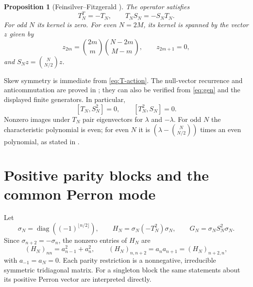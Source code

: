 \documentclass[11pt,reqno]{amsart}
\newtheorem{proposition}[theorem]{Proposition}
\theoremstyle{definition}\newtheorem{definition}[theorem]{Definition}
\theoremstyle{remark}\newtheorem{remark}[theorem]{Remark}
\DeclareMathOperator{\diag}{diag}
\begin{document}
\begin{proposition}[Feinsilver--Fitzgerald \cite{FF}]
\label{prop:T}
The operator satisfies
\begin{equation}\label{eq:anticommutation}
T_N^T=-T_N,\qquad T_NS_N=-S_NT_N.
\end{equation}
For odd $N$ its kernel is zero. For even $N=2M$, its kernel is spanned
by the vector $z$ given by
\begin{equation}\label{eq:exceptional-vector}
z_{2m}=\binom{2m}{m}\binom{N-2m}{M-m},\qquad z_{2m+1}=0,
\end{equation}
and $S_Nz=\binom N{N/2}z$.
\end{proposition}
Skew symmetry is immediate from \eqref{eq:T-action}. The null-vector
recurrence and anticommutation are proved in \cite{FF}; they can also
be verified from \eqref{eq:gen} and the displayed finite generators.
In particular,
\begin{equation}\label{eq:square-commutation}
[T_N,S_N^2]=0,\qquad [T_N^2,S_N]=0.
\end{equation}
Nonzero images under $T_N$ pair eigenvectors for $\lambda$ and $-\lambda$.
For odd $N$ the characteristic polynomial is even; for even $N$ it is
$(\lambda-\binom N{N/2})$ times an even polynomial, as stated in \cite{FF}.

\section{Positive parity blocks and the common Perron mode}
Let
\begin{equation}\label{eq:sign-conjugation}
\sigma_N=\diag((-1)^{\lfloor n/2\rfloor}),\qquad
H_N=\sigma_N(-T_N^2)\sigma_N,\qquad
G_N=\sigma_NS_N^2\sigma_N.
\end{equation}
Since $\sigma_{n+2}=-\sigma_n$, the nonzero entries of $H_N$ are
\begin{equation}\label{eq:H-entries}
(H_N)_{nn}=a_{n-1}^2+a_n^2,\qquad
(H_N)_{n,n+2}=a_na_{n+1}=(H_N)_{n+2,n},
\end{equation}
with $a_{-1}=a_N=0$. Each parity restriction is a nonnegative,
irreducible symmetric tridiagonal matrix. For a singleton block the
same statements about its positive Perron vector are interpreted directly.
\end{document}
